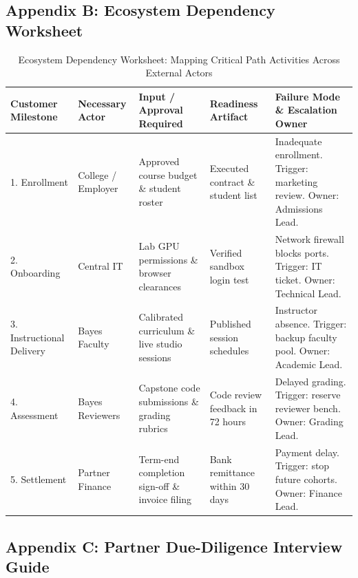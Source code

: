 \subsection*{Appendix B: Ecosystem Dependency Worksheet}
\label{sec:app_ecosystem_dependency_worksheet}

\begin{table}[t]
\centering
\small
\caption{Ecosystem Dependency Worksheet: Mapping Critical Path Activities Across External Actors}
\label{tab:app_ecosystem_dependency_worksheet}
\begin{tabularx}{\textwidth}{p{2.6cm} p{2.8cm} p{3.2cm} p{3.2cm} X}
\toprule
\textbf{Customer Milestone} & \textbf{Necessary Actor} & \textbf{Input / Approval Required} & \textbf{Readiness Artifact} & \textbf{Failure Mode \& Escalation Owner} \\
\midrule
1. Enrollment & College / Employer & Approved course budget \& student roster & Executed contract \& student list & Inadequate enrollment. Trigger: marketing review. Owner: Admissions Lead. \\
2. Onboarding & Central IT & Lab GPU permissions \& browser clearances & Verified sandbox login test & Network firewall blocks ports. Trigger: IT ticket. Owner: Technical Lead. \\
3. Instructional Delivery & Bayes Faculty & Calibrated curriculum \& live studio sessions & Published session schedules & Instructor absence. Trigger: backup faculty pool. Owner: Academic Lead. \\
4. Assessment & Bayes Reviewers & Capstone code submissions \& grading rubrics & Code review feedback in 72 hours & Delayed grading. Trigger: reserve reviewer bench. Owner: Grading Lead. \\
5. Settlement & Partner Finance & Term-end completion sign-off \& invoice filing & Bank remittance within 30 days & Payment delay. Trigger: stop future cohorts. Owner: Finance Lead. \\
\bottomrule
\end{tabularx}
\end{table}

\subsection*{Appendix C: Partner Due-Diligence Interview Guide}
\label{sec:app_due_diligence_guide}

